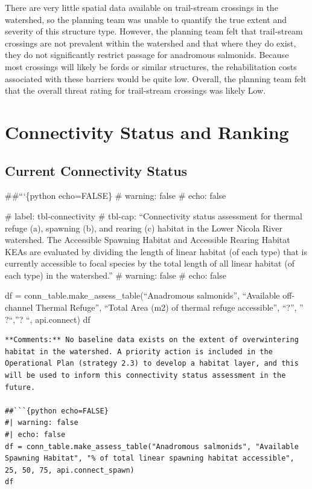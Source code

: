 \documentclass[
  letterpaper,
  DIV=11,
  numbers=noendperiod]{scrreprt}
\begin{document}
There are very little spatial data available on trail-stream crossings
in the watershed, so the planning team was unable to quantify the true
extent and severity of this structure type. However, the planning team
felt that trail-stream crossings are not prevalent within the watershed
and that where they do exist, they do not significantly restrict passage
for anadromous salmonids. Because most crossings will likely be fords or
similar structures, the rehabilitation costs associated with these
barriers would be quite low. Overall, the planning team felt that the
overall threat rating for trail-stream crossings was likely Low.


\hypertarget{connectivity-status-and-ranking}{%
\chapter{Connectivity Status and
Ranking}\label{connectivity-status-and-ranking}}

\hypertarget{current-connectivity-status-1}{%
\section*{Current Connectivity
Status}\label{current-connectivity-status-1}}


\#\#```\{python echo=FALSE\} \#\textbar{} warning: false \#\textbar{}
echo: false

\#\textbar{} label: tbl-connectivity \#\textbar{} tbl-cap:
``Connectivity status assessment for thermal refuge (a), spawning (b),
and rearing (c) habitat in the Lower Nicola River watershed. The
Accessible Spawning Habitat and Accessible Rearing Habitat KEAs are
evaluated by dividing the length of linear habitat (of each type) that
is currently accessible to focal species by the total length of all
linear habitat (of each type) in the watershed.'' \#\textbar{} warning:
false \#\textbar{} echo: false

df = conn\_table.make\_assess\_table(``Anadromous salmonids'',
``Available off-channel Thermal Refuge'', ``Total Area (m2) of thermal
refuge accessible'', ``?'', '' ?``,''? ``, api.connect) df

\begin{verbatim}
**Comments:** No baseline data exists on the extent of overwintering habitat in the watershed. A priority action is included in the Operational Plan (strategy 2.3) to develop a habitat layer, and this will be used to inform this connectivity status assessment in the future.

##```{python echo=FALSE}
#| warning: false
#| echo: false
df = conn_table.make_assess_table("Anadromous salmonids", "Available Spawning Habitat", "% of total linear spawning habitat accessible", 25, 50, 75, api.connect_spawn)
df
\end{verbatim}
\end{document}
